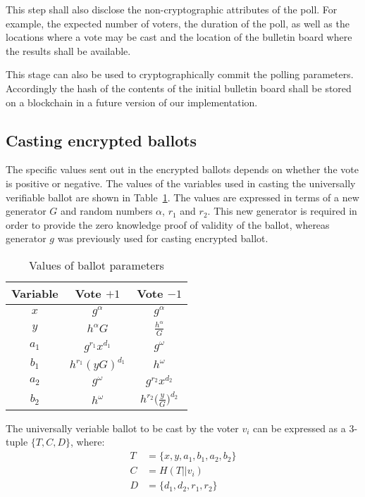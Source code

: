 This step shall also disclose the non-cryptographic
attributes of the poll. For example, the expected number of voters,
the duration of the poll, as well as the
locations where a vote may be cast and the location of the
bulletin board where the results shall be available.

This stage can also be used to cryptographically commit the
polling parameters.  Accordingly the hash of the contents of the
initial bulletin board shall be stored on a blockchain
in a future version of our implementation.


\subsection{Casting encrypted ballots}

The specific values sent out in the encrypted ballots depends on
whether the vote is positive or negative.  The values of the variables
used in casting the universally verifiable ballot are shown in
Table~\ref{table:ballotparams}.  The values are expressed in terms of
a new generator $G$ and random numbers $\alpha$, $r_1$ and $r_2$.
This new generator is required in order to
provide the zero knowledge proof of validity of the ballot,
whereas generator $g$ was previously used for casting encrypted ballot.


\begin{table}[t]
\caption{Values of ballot parameters}
\begin{center}
  \begin{tabular}{c|c|c} 
    Variable & Vote $+1$ & Vote $-1$ \\\hline
    $x$   &  $g^\alpha$ &   $g^\alpha$ \\
    $y$   &  $h^\alpha G$ & $\frac{h^\alpha}{G}$  \\
    $a_1$ &  $g^{r_1}x^{d_1}$ & $g^\omega$  \\
    $b_1$ &  $h^{r_1}(yG)^{d_1}$ & $h^\omega$  \\
    $a_2$ &  $g^\omega$ &  $g^{r_2}x^{d_2}$ \\
    $b_2$ &  $h^\omega$ & $h^{r_2} \big( \frac{y}{G} \big)^{d_2}$ \\
\end{tabular}
\label{table:ballotparams}
\end{center}
\end{table}



The universally veriable ballot to be cast by the voter $v_i$
can be expressed as a 3-tuple $\{T,C,D\}$, where:
\begin{equation} \label{eq3}
\begin{split}
T & = \{ x, y, a_1, b_1, a_2, b_2 \} \\
C & = H( T || v_i ) \\    %
D & = \{d_1, d_2, r_1, r_2 \} 
\end{split}
\end{equation}


